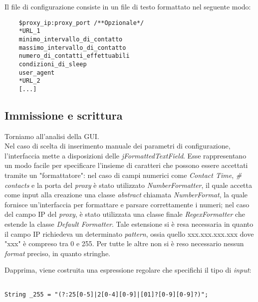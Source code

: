 Il file di configurazione consiste in un file di testo formattato nel seguente modo:

\vspace{0.5cm}
\begin{lstlisting}
	$proxy_ip:proxy_port /**Opzionale*/
	*URL_1
	minimo_intervallo_di_contatto
	massimo_intervallo_di_contatto
	numero_di_contatti_effettuabili
	condizioni_di_sleep
	user_agent
	*URL_2
	[...]
\end{lstlisting}

\subsection{Immissione e scrittura}

Torniamo all'analisi della GUI.\\


Nel caso di scelta di inserimento manuale dei parametri di configurazione, l'interfaccia mette a disposizioni delle \textit{jFormattedTextField}. Esse rappresentano un modo facile per specificare l'insieme di caratteri che possono essere accettati tramite un "formattatore": nel caso di campi numerici come \textit{Contact Time}, \textit{\# contacts} e la porta del \textit{proxy} \`{e} stato utilizzato \textit{NumberFormatter}, il quale accetta come input alla creazione una classe \textit{abstract} chiamata \textit{NumberFormat}, la quale fornisce un'interfaccia per formattare e parsare correttamente i numeri; nel caso del campo IP del \textit{proxy}, \`{e} stato utilizzata una classe finale \textit{RegexFormatter} che estende la classe \textit{Default Formatter}. Tale estensione si \`{e} resa necessaria in quanto il campo IP richiedeva un determinato \textit{pattern}, ossia quello xxx.xxx.xxx.xxx dove "xxx" è compreso tra 0 e 255. Per tutte le altre non si \`{e} reso necessario nessun \textit{format} preciso, in quanto stringhe.


Dapprima, viene costruita una espressione regolare che specifichi il tipo di \textit{input}:


\vspace{0.5cm}

\begin{lstlisting}

String _255 = "(?:25[0-5]|2[0-4][0-9]|[01]?[0-9][0-9]?)";

\end{lstlisting}



